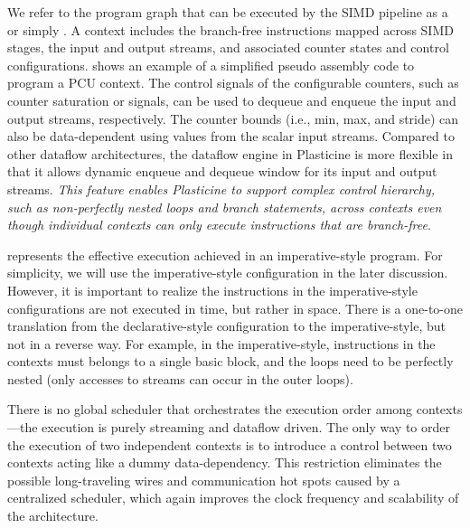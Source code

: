 We refer to the program graph that can be executed by the SIMD pipeline as a  or
simply . 
A context includes the branch-free instructions mapped across SIMD stages, the input and output streams, and associated counter states and control configurations.
 shows an example of a simplified pseudo assembly code to program a PCU context.
The control signals of the configurable counters, such as counter saturation or 
signals, can be used to dequeue and enqueue the input and output streams, respectively.
The counter bounds (i.e., min, max, and stride) can also be data-dependent using values from the scalar input streams. Compared to other dataflow architectures, the dataflow engine in Plasticine is more flexible in that it allows dynamic enqueue and dequeue window for its input and output streams.
\emph{This feature enables Plasticine to support complex control hierarchy, such as non-perfectly nested loops and
branch statements, across contexts even though individual contexts can only execute instructions that are
branch-free}. 

 represents the effective execution achieved in an imperative-style program.
For simplicity, we will use the imperative-style configuration in the later discussion.
However, it is important to realize the instructions in the imperative-style configurations are not
executed in time, but rather in space.
There is a one-to-one translation from the declarative-style configuration to the imperative-style, but not in a reverse way.
For example, in the imperative-style, 
instructions in the contexts must belongs to a single basic block, and the loops need to be
perfectly nested (only accesses to streams can occur in the outer loops).

There is no global scheduler that orchestrates the execution order among contexts---the execution is purely
streaming and dataflow driven. 
The only way to order the execution of two independent contexts is to introduce a control  between two contexts acting like a dummy data-dependency.
This restriction eliminates the possible long-traveling wires and communication hot spots caused by a
centralized scheduler, which again improves the clock frequency and scalability of the architecture.

